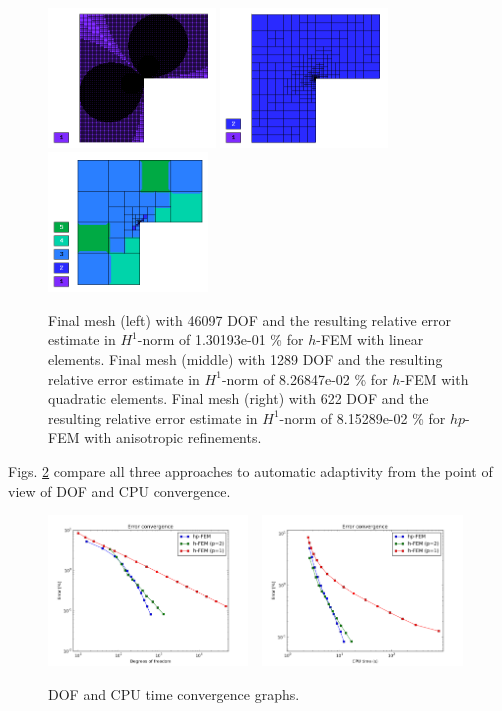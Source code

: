 \documentclass[12pt]{elsarticle}
\begin{document}
\begin{figure}[!ht]
\centering
\includegraphics[height=3.7cm]{nist/nist-2/mesh_h1_aniso.png}
\includegraphics[height=3.7cm]{nist/nist-2/mesh_h2_aniso.png}
\includegraphics[height=3.7cm]{nist/nist-2/mesh_hp_aniso.png}
\caption{
Final mesh (left) with 46097 DOF and the resulting
relative error estimate in $H^1$-norm of 1.30193e-01 \% for $h$-FEM with linear elements.
Final mesh (middle) with 1289 DOF and the resulting
relative error estimate in $H^1$-norm of 8.26847e-02 \% for $h$-FEM with quadratic elements.
Final mesh (right) with 622 DOF and the resulting
relative error estimate in $H^1$-norm of 8.15289e-02 \% for $hp$-FEM with anisotropic refinements.}
\label{fig:nist-2-hp-aniso}
\end{figure}

Figs. \ref{fig:nist-2-conv} compare all
three approaches to automatic adaptivity from the point
of view of DOF and CPU convergence.

\begin{figure}[!ht]
\centering
\includegraphics[height=4cm]{nist/nist-2/conv_dof_aniso.png}\ \
\includegraphics[height=4cm]{nist/nist-2/conv_cpu_aniso.png}
\caption{DOF and CPU time convergence graphs.}
\label{fig:nist-2-conv}
\end{figure}
\end{document}
